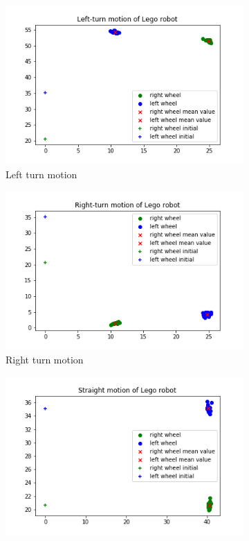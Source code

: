 \documentclass[11pt,a4paper,openright,twoside]{extreport}
\begin{document}
\begin{itemize}
\begin{figure}[H]
\centering
\begin{subfigure}[b]{0.45\textwidth}
\includegraphics[width=\textwidth]{Left-turn.png}
\caption{Left turn motion}
\label{left}
\end{subfigure}
\begin{subfigure}[b]{0.45\textwidth}
\includegraphics[width=\textwidth]{Right-turn.png}
\caption{Right turn motion}
\label{right}
\end{subfigure}
\begin{subfigure}[b]{0.45\textwidth}
\includegraphics[width=\textwidth]{Straight.png}

\end{subfigure}
\end{figure}
\end{itemize}
\end{document}
